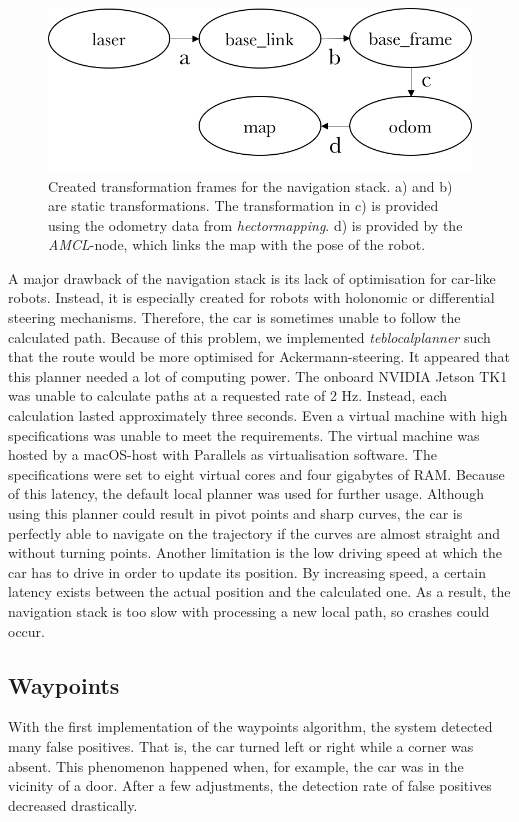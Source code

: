 \documentclass[conference,a4paper]{IEEEtran}
\begin{document}
\begin{figure}[!t]
	\includegraphics[width=\columnwidth]{navstack_tf2}
	\centering
	\caption{Created transformation frames for the navigation stack. a) and b) are static transformations. The transformation in c) is provided using the odometry data from \emph{hector\textunderscore mapping}. d) is provided by the \emph{AMCL}-node, which links the map with the pose of the robot.}
	\label{fig:navstack_tf}
\end{figure}

A major drawback of the navigation stack is its lack of optimisation for car-like robots. Instead, it is especially created for robots with holonomic or differential steering mechanisms. Therefore, the car is sometimes unable to follow the calculated path. Because of this problem, we implemented \emph{teb\textunderscore local\textunderscore planner} such that the route would be more optimised for Ackermann-steering. It appeared that this planner needed a lot of computing power. The onboard NVIDIA Jetson TK1 was unable to calculate paths at a requested rate of 2 Hz. Instead, each calculation lasted approximately three seconds. Even a virtual machine with high specifications was unable to meet the requirements. The virtual machine was hosted by a macOS-host with Parallels as virtualisation software. The specifications were set to eight virtual cores and four gigabytes of RAM. Because of this latency, the default local planner was used for further usage. Although using this planner could result in pivot points and sharp curves, the car is perfectly able to navigate on the trajectory if the curves are almost straight and without turning points.
Another limitation is the low driving speed at which the car has to drive in order to update its position. By increasing speed, a certain latency exists between the actual position and the calculated one. As a result, the navigation stack is too slow with processing a new local path, so crashes could occur.

\subsection{Waypoints}
With the first implementation of the waypoints algorithm, the system detected many false positives. That is, the car turned left or right while a corner was absent. This phenomenon happened when, for example, the car was in the vicinity of a door. After a few adjustments, the detection rate of false positives decreased drastically. 
\end{document}

